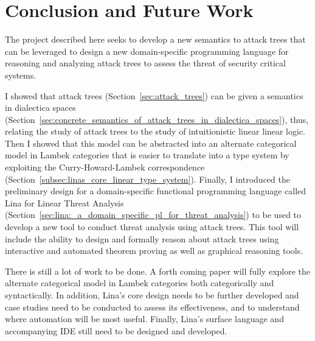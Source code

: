 \documentclass{sigplanconf}
\begin{document}
\section{Conclusion and Future Work}
\label{sec:conclusion}

The project described here seeks to develop a new semantics to attack
trees that can be leveraged to design a new domain-specific
programming language for reasoning and analyzing attack trees to assess
the threat of security critical systems.

I showed that attack trees (Section~\ref{sec:attack_trees}) can be
given a semantics in dialectica spaces
(Section~\ref{sec:concrete_semantics_of_attack_trees_in_dialectica_spaces}),
thus, relating the study of attack trees to the study of
intuitionistic linear linear logic.  Then I showed that this model can
be abstracted into an alternate categorical model in Lambek categories
that is easier to translate into a type system by exploiting the
Curry-Howard-Lambek correspondence
(Section~\ref{subsec:linas_core_linear_type_system}).  Finally, I
introduced the preliminary design for a domain-specific functional
programming language called Lina for Linear Threat Analysis
(Section~\ref{sec:lina:_a_domain_specific_pl_for_threat_analysis}) to
be used to develop a new tool to conduct threat analysis using attack
trees.  This tool will include the ability to design and formally
reason about attack trees using interactive and automated theorem
proving as well as graphical reasoning tools.

There is still a lot of work to be done.  A forth coming paper will
fully explore the alternate categorical model in Lambek categories
both categorically and syntactically.  In addition, Lina's core design
needs to be further developed and case studies need to be conducted to
assess its effectiveness, and to understand where automation will be
most useful.  Finally, Lina's surface language and accompanying IDE
still need to be designed and developed.


\end{document}
